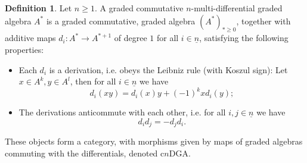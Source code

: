 \documentclass[10pt, a4paper, UKenglish]{article}
\numberwithin{equation}{section}
\newcommand{\bZ}{\mathbb{Z}}
\newcommand{\ind}[1]{\underline{#1}}
\newcommand{\comm}[1]{\colorbox{yellow}{#1}}
\newcommand{\cndga}{\mathrm{c}n\mathrm{DGA}}
\theoremstyle{plain}
\theoremstyle{definition}
\newtheorem{defn}[equation]{Definition}
\renewcommand{\to}{\longrightarrow}
\begin{document}
\begin{defn}\label{def_cmdga}
Let $n \geq 1$. A graded commutative $n$-multi-differential graded algebra $A^*$ is a graded commutative, graded algebra $(A^*)_{* \geq 0}$, together with additive maps $d_i: A^* \to A^{*+1}$ of degree $1$ for all $i \in \ind{n}$, satisfying the following properties:
\begin{itemize}
\item Each $d_i$ is a derivation, i.e. obeys the Leibniz rule (with Koszul sign): Let $x \in A^k, y \in A^l$, then for all $i \in \ind{n}$ we have%
$$d_i (xy) = d_i(x)y + (-1)^{k}xd_i(y);$$
\item The derivations anticommute with each other, i.e. for all $i,j \in \ind{n}$ we have%
$$d_i d_j = - d_j d_i.$$
\end{itemize}
These objects form a category, with morphisms given by maps of graded algebras commuting with the differentials, denoted $\cndga$.
\end{defn}
%
%
\end{document}

